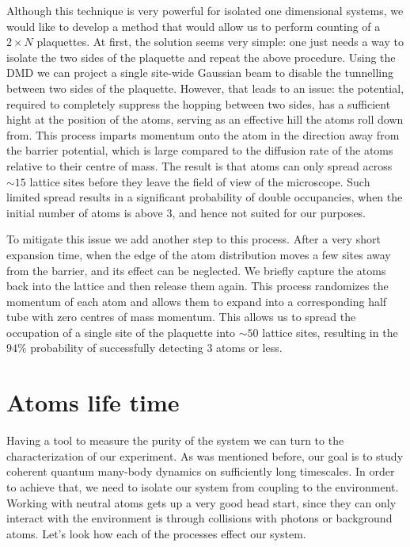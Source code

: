 Although this technique is very powerful for isolated one dimensional systems, we would like to develop a method that would allow us to perform counting of a $2\times N$ plaquettes. At first, the solution seems very simple: one just needs a way to isolate the two sides of the plaquette and repeat the above procedure. Using the DMD we can project a single site-wide Gaussian beam to disable the tunnelling between two sides of the plaquette. However, that leads to an issue: the potential, required to completely suppress the hopping between two sides, has a sufficient hight at the position of the atoms, serving as an effective hill the atoms roll down from. This process imparts momentum onto the atom in the direction away from the barrier potential, which is large compared to the diffusion rate of the atoms relative to their centre of mass. The result is that atoms can only spread across $\sim 15$ lattice sites before they leave the field of view of the microscope. Such limited spread results in a significant probability of double occupancies, when the initial number of atoms is above $3$, and hence not suited for our purposes.

To mitigate this issue we add another step to this process. After a very short expansion time, when the edge of the atom distribution moves a few sites away from the barrier, and its effect can be neglected. We briefly capture the atoms back into the lattice and then release them again. This process randomizes the momentum of each atom and allows them to expand into a corresponding half tube with zero centres of mass momentum. This allows us to spread the occupation of a single site of the plaquette into $\sim 50$ lattice sites, resulting in the $94\%$ probability of successfully detecting $3$ atoms or less.

\section{Atoms life time}
Having a tool to measure the purity of the system we can turn to the characterization of our experiment. As was mentioned before, our goal is to study coherent quantum many-body dynamics on sufficiently long timescales. In order to achieve that, we need to isolate our system from coupling to the environment. Working with neutral atoms gets up a very good head start, since they can only interact with the environment is through collisions with photons or background atoms. Let's look how each of the processes effect our system.

